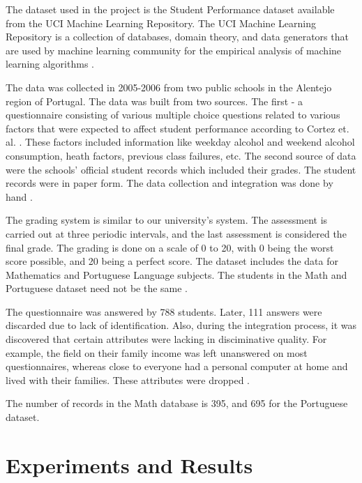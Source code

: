 \documentclass[conference]{IEEEtran}
\begin{document}
The dataset used in the project is the Student Performance dataset available from the UCI 
Machine Learning Repository. The UCI Machine Learning Repository is a collection of databases, 
domain theory, and data generators that are used by machine learning community for the empirical 
analysis of machine learning algorithms \cite{Lichman:2013}.

The data was collected in 2005-2006 from two public schools in the Alentejo region of Portugal. 
The data was built from two sources. The first - a questionnaire consisting of various multiple choice 
questions related to various factors that were expected to affect student performance according 
to Cortez et. al. \cite{ref:4}. These factors included information like weekday alcohol and 
weekend alcohol consumption, heath factors, previous class failures, etc. The second source of 
data were the schools' official student records which included their grades. The student records 
were in paper form. The data collection and integration was done by hand \cite{ref:4}.

The grading system is similar to our university's system. The assessment is carried out at three 
periodic intervals, and the last assessment is considered the final grade. The grading is done on a scale 
of 0 to 20, with 0 being the worst score possible, and 20 being a perfect score. The dataset includes 
the data for Mathematics and Portuguese Language subjects. The students in the Math and Portuguese dataset 
need not be the same \cite{ref:4}.

The questionnaire was answered by 788 students. Later, 111 answers were discarded due to lack of identification. 
Also, during the integration process, it was discovered that certain attributes were lacking in disciminative 
quality. For example, the field on their family income was left unanswered on most questionnaires, whereas close 
to everyone had a personal computer at home and lived with their families. These attributes were dropped \cite{ref:4}.

The number of records in the Math database is 395, and 695 for the Portuguese dataset.

	\section{Experiments and Results} \label{expts-reslts}
\end{document}
